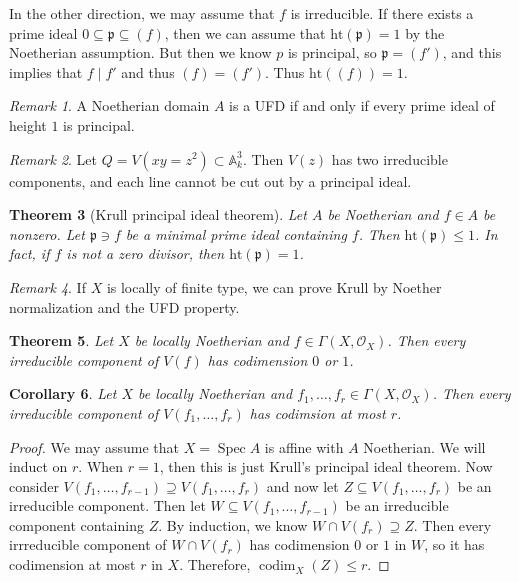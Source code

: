\documentclass[leqno, openany]{memoir}
\newtheorem{thm}{Theorem}[section]
\newtheorem{cor}[thm]{Corollary}
\theoremstyle{definition}
\theoremstyle{remark}
\newtheorem{rmk}[thm]{Remark}
\theoremstyle{plain}
\theoremstyle{definition}
\theoremstyle{remark}
\newcommand{\A}{\mathbb{A}}
\newcommand{\mc}[1]{\mathcal{#1}}
\newcommand{\mf}[1]{\mathfrak{#1}}
\newcommand{\mr}[1]{\mathrm{#1}}
\DeclareMathOperator{\Spec}{Spec}
\DeclareMathOperator{\codim}{codim}
\begin{document}
In the other direction, we may assume that $f$ is irreducible. If there exists
a prime ideal $0 \subseteq \mf{p} \subseteq (f)$, then we can assume that
$\mr{ht}(\mf{p}) = 1$ by the Noetherian assumption. But then we know $p$ is
principal, so $\mf{p} = (f')$, and this implies that $f \mid f'$ and thus $(f)
= (f')$. Thus $\mr{ht}((f)) = 1$.

\begin{rmk} A Noetherian domain $A$ is a UFD if and only if every prime ideal
of height $1$ is principal.  \end{rmk}

\begin{rmk} Let $Q = V(xy = z^2) \subset \A^3_k$. Then $V(z)$ has two
irreducible components, and each line cannot be cut out by a principal ideal.
\end{rmk}

\begin{thm}[Krull principal ideal theorem] Let $A$ be Noetherian and $f \in A$
    be nonzero. Let $\mf{p} \ni f$ be a minimal prime ideal containing $f$.
    Then $\mr{ht}(\mf{p}) \leq 1$. In fact, if $f$ is not a zero divisor, then
    $\mr{ht}(\mf{p}) = 1$.  \end{thm}

\begin{rmk} If $X$ is locally of finite type, we can prove Krull by Noether
normalization and the UFD property.  \end{rmk}

\begin{thm} Let $X$ be locally Noetherian and $f \in \Gamma(X, \mc{O}_X)$. Then
every irreducible component of $V(f)$ has codimension $0$ or $1$.  \end{thm}

\begin{cor} Let $X$ be locally Noetherian and $f_1, \ldots, f_r \in \Gamma(X,
\mc{O}_X)$. Then every irreducible component of $V(f_1, \ldots, f_r)$ has
codimsion at most $r$.  \end{cor}

\begin{proof} We may assume that $X = \Spec A$ is affine with $A$ Noetherian.
    We will induct on $r$. When $r = 1$, then this is just Krull's principal
    ideal theorem. Now consider $V(f_1, \ldots, f_{r-1}) \supseteq V(f_1,
    \ldots, f_r)$ and now let $Z \subseteq V(f_1, \ldots, f_r)$ be an
    irreducible component. Then let $W \subseteq V(f_1, \ldots, f_{r-1})$ be an
    irreducible component containing $Z$. By induction, we know $W \cap V(f_r)
    \supseteq Z$. Then every irrreducible component of $W \cap V(f_r)$ has
    codimension $0$ or $1$ in $W$, so it has codimension at most $r$ in $X$.
    Therefore, $\codim_X (Z) \leq r$.  \end{proof}
\end{document}
